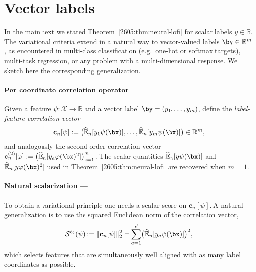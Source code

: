 \section{Vector labels}

\label{2605:app:vector-labels}
\providecommand{\bc}{\mathbf{c}}

In the main text we stated Theorem~\ref{2605:thm:neural-lofi} for scalar labels $y\in\mathbb{R}$. The variational criteria extend in a natural way to vector-valued labels $\by\in\mathbb{R}^m$, as encountered in multi-class classification (e.g.\ one-hot or softmax targets), multi-task regression, or any problem with a multi-dimensional response. We sketch here the corresponding generalization.

\paragraph{Per-coordinate correlation operator ---} Given a feature $\psi:\mathcal{X}\to\mathbb{R}$ and a vector label $\by=(y_1,\dots,y_m)$, define the \emph{label-feature correlation vector}
\begin{equation}\label{2605:eq:vec-corr}
\bc_n[\psi] := \bigl(\widehat{\mathbb{E}}_n[y_1 \psi(\bx)], \dots, \widehat{\mathbb{E}}_n[y_m \psi(\bx)]\bigr) \in \mathbb{R}^m,
\end{equation}
and analogously the second-order correlation vector $\bc_n^{(2)}[\varphi]:=\bigl(\widehat{\mathbb{E}}_n[y_a \varphi(\bx)^2]\bigr)_{a=1}^m$. The scalar quantities $\widehat{\mathbb{E}}_n[y \psi(\bx)]$ and $\widehat{\mathbb{E}}_n[y \varphi(\bx)^2]$ used in Theorem~\ref{2605:thm:neural-lofi} are recovered when $m=1$.

\paragraph{Natural scalarization ---} To obtain a variational principle one needs a scalar score on $\bc_n[\psi]$. A natural generalization is to use the squared Euclidean norm of the correlation vector,
\begin{equation}\label{2605:eq:vec-l2}
\mathcal{S}^{\ell_2}(\psi) := \|\bc_n[\psi]\|_2^2 = \sum_{a=1}^d \bigl(\widehat{\mathbb{E}}_n[y_a \psi(\bx)]\bigr)^2,
\end{equation}
which selects features that are simultaneously well aligned with as many label coordinates as possible.


